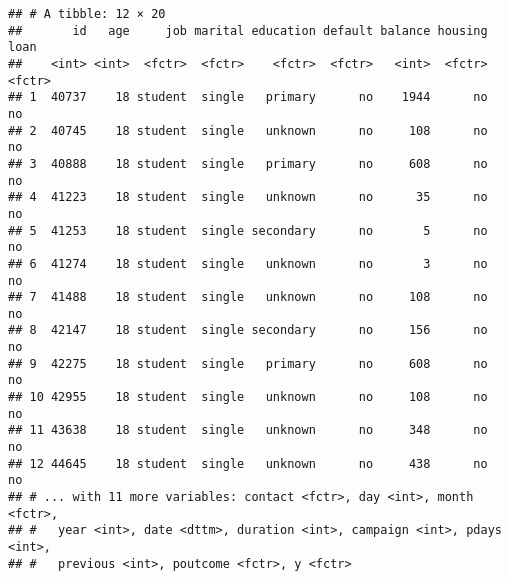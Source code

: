 \documentclass[]{book}
\newenvironment{Shaded}{\begin{snugshade}}{\end{snugshade}}
\newcommand{\KeywordTok}[1]{\textcolor[rgb]{0.13,0.29,0.53}{\textbf{{#1}}}}
\newcommand{\DecValTok}[1]{\textcolor[rgb]{0.00,0.00,0.81}{{#1}}}
\newcommand{\StringTok}[1]{\textcolor[rgb]{0.31,0.60,0.02}{{#1}}}
\newcommand{\CommentTok}[1]{\textcolor[rgb]{0.56,0.35,0.01}{\textit{{#1}}}}
\newcommand{\NormalTok}[1]{{#1}}
\begin{document}
\begin{verbatim}
## # A tibble: 12 × 20
##       id   age     job marital education default balance housing   loan
##    <int> <int>  <fctr>  <fctr>    <fctr>  <fctr>   <int>  <fctr> <fctr>
## 1  40737    18 student  single   primary      no    1944      no     no
## 2  40745    18 student  single   unknown      no     108      no     no
## 3  40888    18 student  single   primary      no     608      no     no
## 4  41223    18 student  single   unknown      no      35      no     no
## 5  41253    18 student  single secondary      no       5      no     no
## 6  41274    18 student  single   unknown      no       3      no     no
## 7  41488    18 student  single   unknown      no     108      no     no
## 8  42147    18 student  single secondary      no     156      no     no
## 9  42275    18 student  single   primary      no     608      no     no
## 10 42955    18 student  single   unknown      no     108      no     no
## 11 43638    18 student  single   unknown      no     348      no     no
## 12 44645    18 student  single   unknown      no     438      no     no
## # ... with 11 more variables: contact <fctr>, day <int>, month <fctr>,
## #   year <int>, date <dttm>, duration <int>, campaign <int>, pdays <int>,
## #   previous <int>, poutcome <fctr>, y <fctr>
\end{verbatim}

\begin{Shaded}
\end{Shaded}
\end{document}
